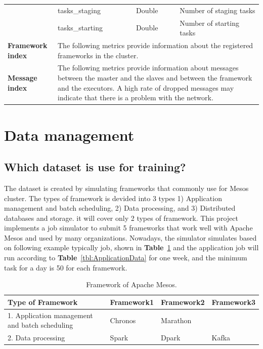 \documentclass[12pt,oneside,openright,a4paper]{cpe-english-project}
\begin{document}
\begin{table}[!h]
\begin{tabular}{|p{}|p{}|p{}|p{}|}
    \cline{2-4} & tasks\_staging & Double & Number of staging tasks \\ 
    \cline{2-4} & tasks\_starting & Double & Number of starting tasks \\ 
    \hline
    \textbf{Framework index} & \multicolumn{3}{p{0.7\textwidth}|}{ The following metrics provide information about the registered frameworks in the cluster.} \\ 
    \hline
    \textbf{Message index} & \multicolumn{3}{p{0.7\textwidth}|}{ The following metrics provide information about messages between the master and the slaves and between the framework and the executors. A high rate of dropped messages may indicate that there is a problem with the network.} \\ 
    \hline
  \end{tabular}
\end{table}

\newpage

\section{Data management}

\subsection{Which dataset is use for training?}
\hspace{10mm}The dataset is created by simulating frameworks that commonly use for Mesos cluster. The types of framework is devided into 3 types 1) Application management and batch scheduling, 2) Data processing, and 3) Distributed databases and storage. it will cover only 2 types of framework. This project implements a job simulator to submit 5 frameworks that work well with Apache Mesos and used by many organizations. Nowadays, the simulator simulates based on following example typically job, shown in \textbf{Table}~\ref{tbl:MesosFramework} and the application job will run according to \textbf{Table}~\ref{tbl:ApplicationData} for one week, and the minimum task for a day is 50 for each framework.

\begin{table}[!h]
  \caption{Framework of Apache Mesos.}\label{tbl:MesosFramework}
    \begin{tabular}{@{}|p{}|p{}|p{}|p{}|}
    \hline
    \textbf{Type of Framework} & \textbf{Framework1} & \textbf{Framework2} & \textbf{Framework3}\\
    \hline
    1. Application management and batch scheduling & Chronos & Marathon & \\
    \hline
    2. Data processing & Spark & Dpark & Kafka\\
    \hline
  \end{tabular}
\end{table}
\end{document}
